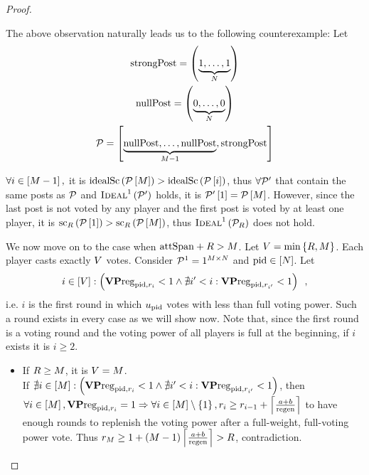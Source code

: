 \begin{proof}
\begin{itemize}
    The above observation naturally leads us to the following counterexample:
    Let
    \begin{gather*}
      \strongpost = \left(\underbrace{1, \dots, 1}_{\playerlen}\right) \\
      \nullpost = \left(\underbrace{0, \dots, 0}_{\playerlen}\right) \\
      \postlist = \left[\underbrace{\nullpost, \dots, \nullpost}_{\postlen -
      1}, \strongpost\right]
    \end{gather*}

    $\forall i \in \left[\postlen - 1\right],$ it is
    $\idsc{\postlist\left[\postlen\right]} >
    \idsc{\postlist\left[i\right]}$, thus $\forall \postlist'$ that
    contain the same posts as $\postlist$ and
    $\textsc{Ideal}^1\left(\postlist'\right)$ holds, it is
    $\postlist'\left[1\right] = \postlist\left[\postlen\right]$. However,
    since the last post is not voted by any player and the first post is voted
    by at least one player, it is
    $\mathrm{sc}_\rounds\left(\postlist\left[1\right]\right) >
    \mathrm{sc}_\rounds\left(\postlist\left[\postlen\right]\right)$, thus
    $\textsc{Ideal}^1\left(\postlist_\rounds\right)$ does not hold.

    We now move on to the case when $\attspan + \rounds > \postlen$. Let
    $\votenum = \min{\left\{\rounds, \postlen\right\}}$. Each player casts
    exactly $\votenum$ votes. Consider $\postlist^1 = 1^{\postlen \times
    \playerlen}$ and $\pid \in \left[\playerlen\right]$. Let
    \begin{equation*}
      i \in \left[\votenum\right] :\left(\votpowvecreg_{\pid, \round_i} < 1
      \wedge \nexists i' < i: \votpowvecreg_{\pid, \round_{i'}} < 1\right)
      \enspace,
    \end{equation*}
    i.e. $i$ is the first round in which $u_\pid$ votes with less than full
    voting power. Such a round exists in every case as we will show now. Note
    that, since the first round is a voting round and the voting power of all
    players is full at the beginning, if $i$ exists it is $i \geq 2$.

    \begin{itemize}
      \item If $\rounds \geq \postlen$, it is $\votenum = \postlen$. \\
      If $\nexists i \in \left[\postlen\right] :\left(\votpowvecreg_{\pid,
      \round_i} < 1 \wedge \nexists i' < i: \votpowvecreg_{\pid, \round_{i'}} <
      1\right)$, then $\forall i \in \left[\postlen\right], \votpowvecreg_{\pid,
      \round_i} = 1 \Rightarrow \forall i \in \left[\postlen\right] \setminus
      \left\{1\right\}, \round_i \geq \round_{i - 1} + \ceil*{\frac{a +
      b}{\regen}}$ to have enough rounds to replenish the voting power after a
      full-weight, full-voting power vote. Thus $\round_\postlen \geq 1 +
      \left(\postlen - 1\right)\ceil*{\frac{a + b}{\regen}} > \rounds$,
      contradiction.


\end{itemize}
\end{itemize}
\end{proof}
